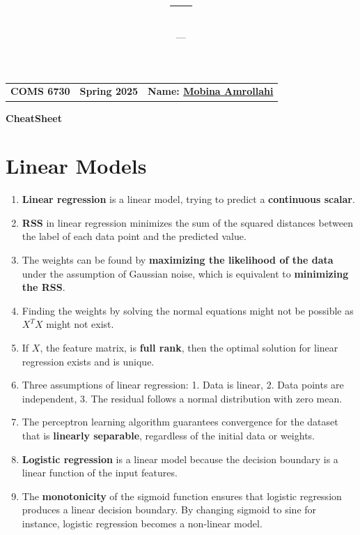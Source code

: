\documentclass[12pt]{article}
\title{---}
\author{---}
\begin{document}

\noindent\begin{tabular}{p{4cm}p{4cm}p{10cm}}
\textbf{COMS 6730} & \textbf{Spring 2025} & \textbf{Name: \underline{Mobina Amrollahi\hspace{4cm}}}
\end{tabular}


\begin{center}
   \textbf{CheatSheet} 
\end{center}
\section*{Linear Models}
\begin{enumerate}
    \item \textbf{Linear regression} is a linear model, trying to predict a \textbf{continuous scalar}.
    \item \textbf{RSS} in linear regression minimizes the sum of the squared distances between the label of each data point and the predicted value.
    \item The weights can be found by \textbf{maximizing the likelihood of the data} under the assumption of Gaussian noise, which is equivalent to \textbf{minimizing the RSS}.
    \item Finding the weights by solving the normal equations might not be possible as $X^TX$ might not exist. 
    \item If $X$, the feature matrix, is \textbf{full rank}, then the optimal solution for linear regression exists and is unique.

    \item Three assumptions of linear regression: 1. Data is linear, 2. Data points are independent, 3. The residual follows a normal distribution with zero mean.
    \item The perceptron learning algorithm guarantees convergence for the dataset that is \textbf{linearly separable}, regardless of the initial data or weights.

    \item \textbf{Logistic regression} is a linear model because the decision boundary is a linear function of the input features.

    \item The \textbf{monotonicity} of the sigmoid function ensures that logistic regression produces a linear decision boundary. By changing sigmoid to sine for instance, logistic regression becomes a non-linear model.
\end{enumerate}
\end{document}
